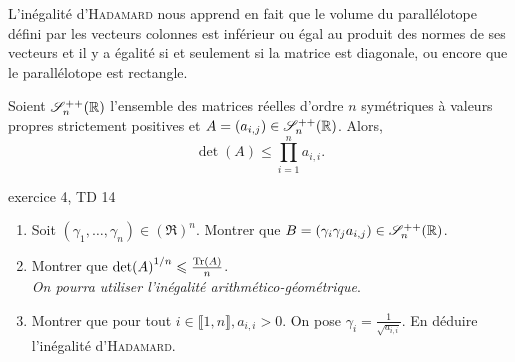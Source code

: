 L'inégalité d'\textsc{Hadamard} nous apprend en fait que le volume du parallélotope défini par les vecteurs colonnes est inférieur ou égal au produit des normes de ses vecteurs et il y a égalité si et seulement si la matrice est diagonale, ou encore que le parallélotope est rectangle. 


\begin{prop}
    Soient $\mathscr{S}_n ^{++} (\mathbb{R})$ l'ensemble des matrices réelles d'ordre $n$ symétriques à valeurs propres strictement positives et $A = (a_{i,j}) \in \mathscr{S}_n ^{++} (\mathbb{R})$. Alors,
    $$\det(A) \leqslant \prod_{i=1}^{n} a_{i,i}.$$
\end{prop}

\begin{exercice}    
exercice 4, TD 14 \cite{acamanes}
\begin{enumerate}
    \item Soit $(\gamma_1, \dots, \gamma_n) \in (\Re)^n$. Montrer que $B = (\gamma_i \gamma_j a_{i,j}) \in \mathscr{S}_n^{++}(\mathbb{R})$. 
    \item Montrer que $\det(A)^{1/n} \leqslant \frac{\mathrm{Tr}(A)}{n}$. \\
    \emph{On pourra utiliser l'inégalité arithmético-géométrique}.
    
    \item Montrer que pour tout $i \in \llbracket 1, n \rrbracket, a_{i,i} > 0$. On pose $\gamma_i = \frac{1}{\sqrt{a_{i,i}}}$. En déduire l'inégalité d'\textsc{Hadamard}.
\end{enumerate}
\end{exercice}

